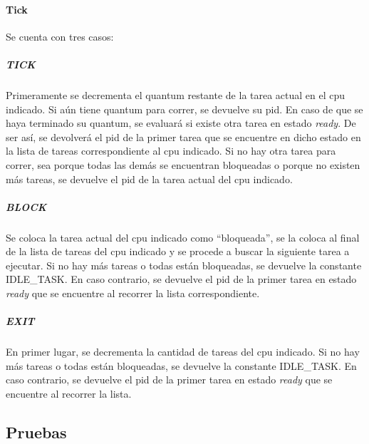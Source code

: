 \paragraph{Tick} Se cuenta con tres casos:

\subparagraph{TICK} Primeramente se decrementa el quantum restante de la tarea actual en el cpu indicado.  Si aún tiene quantum para correr, se devuelve su pid.  En caso de que se haya terminado su quantum, se evaluará si existe otra tarea en estado {\it ready}.  De ser así, se devolverá el pid de la primer tarea que se encuentre en dicho estado en la lista de tareas correspondiente al cpu indicado.  Si no hay otra tarea para correr, sea porque todas las demás se encuentran bloqueadas o porque no existen más tareas, se devuelve el pid de la tarea actual del cpu indicado.
\subparagraph{BLOCK} Se coloca la tarea actual del cpu indicado como ``bloqueada'', se la coloca al final de la lista de tareas del cpu indicado y se procede a buscar la siguiente tarea a ejecutar.  Si no hay más tareas o todas están bloqueadas, se devuelve la constante IDLE_TASK.  En caso contrario, se devuelve el pid de la primer tarea en estado {\it ready} que se encuentre al recorrer la lista correspondiente.
\subparagraph{EXIT} En primer lugar, se decrementa la cantidad de tareas del cpu indicado. Si no hay más tareas o todas están bloqueadas, se devuelve la constante IDLE_TASK.  En caso contrario, se devuelve el pid de la primer tarea en estado {\it ready} que se encuentre al recorrer la lista.

\subsection{Pruebas}